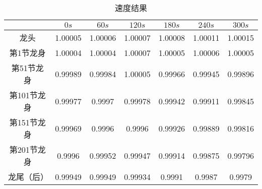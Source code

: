 \documentclass[withoutpreface,bwprint]{cumcmthesis1} %
\begin{document}
\begin{table}[h!]
    \caption{速度结果}
    \centering
    \begin{tabular}{|c|c|c|c|c|c|c|}
    \hline
     & $0s$ & $60s$ & $120s$ & $180s$ & $240s$ & $300s$ \\
    \hline
    龙头 & 1.00005& 1.00006&1.00007&1.00008&1.00011&1.00015\\
    \hline
     第1节龙身& 1.00004 & 1.00004 & 1.00007 & 1.00005& 1.00006 & 1.00005 \\
    \hline
     第51节龙身& 0.99989 & 0.99984 & 1.00005 & 0.99966 &0.99945 & 0.99896 \\
    \hline
     第101节龙身& 0.99977 & 0.9997 & 0.99978 & 0.99942 & 0.99911 & 0.99845 \\
    \hline
     第151节龙身& 0.99969 &0.9996  &0.9996  & 0.99926 & 0.99889& 0.99816 \\
    \hline
     第201节龙身& 0.9996 & 0.99952 & 0.99947 & 0.99914 & 0.99875 & 0.99796 \\
    \hline
     龙尾（后）& 0.99949 & 0.99949 & 0.99934 & 0.9991 & 0.9987 & 0.9979\\
    \hline
    \end{tabular}
    \label{tab:example}
    \end{table}
\end{document}

